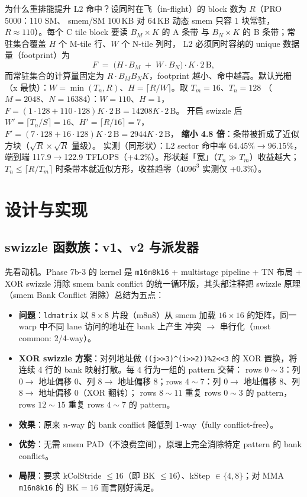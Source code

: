 为什么重排能提升 L2 命中？设同时在飞（in-flight）的 block 数为 $R$（PRO 5000：110 SM、
smem/SM 100\,KB 对 64\,KB 动态 smem 只容 1 块常驻，$R \approx 110$）。每个 C tile block 要读 $B_M\times K$ 的 A 条带
与 $B_N\times K$ 的 B 条带；常驻集合覆盖 $H$ 个 M-tile 行、$W$ 个 N-tile 列时，
L2 必须同时容纳的 unique 数据量（footprint）为
\begin{equation}
  F \;=\; \bigl(H\!\cdot\!B_M \;+\; W\!\cdot\!B_N\bigr)\cdot K\cdot 2\,\mathrm{B},
  \label{eq:12-footprint}
\end{equation}
而常驻集合的计算量固定为 $R\cdot B_M B_N K$，footprint 越小、命中越高。默认光栅
（x 最快）：$W=\min(T_n,R)$、$H=\lceil R/W\rceil$。取 $T_m{=}16$、$T_n{=}128$
（$M{=}2048$、$N{=}16384$）：$W{=}110$、$H{=}1$，
$F=(1{\cdot}128+110{\cdot}128)K\cdot2\,\mathrm{B}=14208K\cdot2\,\mathrm{B}$。
开启 swizzle 后 $W'=\lceil T_n/S\rceil=16$、$H'=\lceil R/16\rceil=7$，
$F'=(7{\cdot}128+16{\cdot}128)K\cdot2\,\mathrm{B}=2944K\cdot2\,\mathrm{B}$，
\textbf{缩小 4.8 倍}：条带被折成了近似方块（$\sqrt{R}\times\sqrt{R}$ 量级）。
实测（同形状）：L2 sector 命中率 64.45\%$\to$96.15\%，端到端 117.9$\to$122.9
TFLOPS（+4.2\%）。形状越「宽」（$T_n\gg T_m$）收益越大；$T_n\le\lceil R/T_m\rceil$
时条带本就近似方形，收益趋零（$4096^3$ 实测仅 +0.3\%）。

\section{设计与实现}

\subsection{swizzle 函数族：v1、v2 与派发器}

先看动机。Phase 7b-3 的 kernel 是 \texttt{m16n8k16} + multistage pipeline + TN
布局 + XOR swizzle 消除 smem bank conflict 的统一循环版，其头部注释把
swizzle 原理（smem Bank Conflict 消除）总结为五点：

\begin{itemize}
  \item \textbf{问题}：\texttt{ldmatrix} 以 $8\times8$ 片段（m8n8）从 smem 加载
        $16\times16$ 的矩阵，同一 warp 中不同 lane 访问的地址在 bank 上产生
        冲突 $\to$ 串行化（most common: 2/4-way）。
  \item \textbf{XOR swizzle 方案}：对列地址做 \texttt{((j>>3)\^{}(i>>2))\%2<<3} 的
        XOR 置换，将连续 4 行的 bank 映射打散。每 4 行为一组的 pattern 交替：
        rows $0{\sim}3$：列 $0\to$ 地址偏移 $0$、列 $8\to$ 地址偏移 $8$；rows
        $4{\sim}7$：列 $0\to$ 地址偏移 $8$、列 $8\to$ 地址偏移 $0$（XOR 翻转）；
        rows $8{\sim}11$ 重复 rows $0{\sim}3$ 的 pattern，rows $12{\sim}15$ 重复
        rows $4{\sim}7$ 的 pattern。
  \item \textbf{效果}：原来 $n$-way 的 bank conflict 降低到 1-way（fully
        conflict-free）。
  \item \textbf{优势}：无需 smem PAD（不浪费空间），原理上完全消除特定
        pattern 的 bank conflict。
  \item \textbf{局限}：要求 kColStride $\le 16$（即 BK $\le 16$）、kStep
        $\in \{4, 8\}$；对 MMA \texttt{m16n8k16} 的 BK$=16$ 而言刚好满足。
\end{itemize}

